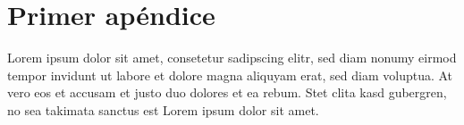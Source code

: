 
\chapter{Primer apéndice}\label{ap:apendice1}

Lorem ipsum dolor sit amet, consetetur sadipscing elitr, sed diam nonumy eirmod
tempor invidunt ut labore et dolore magna aliquyam erat, sed diam voluptua. At
vero eos et accusam et justo duo dolores et ea rebum. Stet clita kasd gubergren,
no sea takimata sanctus est Lorem ipsum dolor sit amet.

\endinput
